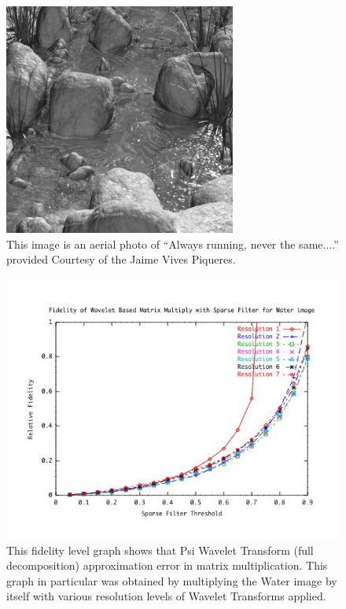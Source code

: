 \begin{figure}[ht]
\begin{center}\includegraphics [width=3in]{water.jpg}\end{center}
\caption{This image is an aerial photo of  ``Always running, never the same....'' provided Courtesy of the Jaime Vives Piqueres\cite{water}.}
\label{imagewater}
\end{figure}

\begin{figure}[ht]
\begin{center}\includegraphics [width=5in]{waterResultsA.jpg}\end{center}
\caption{This fidelity level graph shows that Psi Wavelet Transform (full decomposition) approximation error in matrix multiplication.  This graph in particular was obtained by multiplying the Water image by itself with various resolution levels of Wavelet Transforms applied\cite{water}.}
\end{figure}

